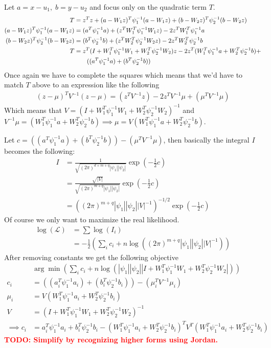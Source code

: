 \documentclass[11pt]{article}
\renewcommand{\det}[1]{|#1|}
\newcommand{\mf}{-\frac{1}{2}}
\newcommand{\todo}[1]{\textbf{\textcolor{red}{TODO: #1}}}
\begin{document}
Let $a = x-u_1, \; b = y-u_2$ and focus only on the quadratic term $T$.
\begin{align}
  T &= z^Tz + (a-W_1z)^T\psi_1^{-1}(a-W_1z) +
  (b-W_2z)^T\psi_2^{-1}(b-W_2z)\\
  (a-W_1z)^T\psi_1^{-1}(a-W_1z) &= (a^T\psi_1^{-1}a)+  (z^TW_1^T\psi_1^{-1}W_1z) - 2z^TW_1^T\psi_1^{-1}a\\
  (b-W_2z)^T\psi_2^{-1}(b-W_2z) &= (b^T\psi_2^{-1}b)+  (z^TW_2^T\psi_2^{-1}W_2z) - 2z^TW_2^T\psi_2^{-1}b\\
  T &= z^T(I+W_1^T\psi_1^{-1}W_1+W_2^T\psi_2^{-1}W_2)z -2z^T(W_1^T\psi_1^{-1}a + W_2^T\psi_2^{-1}b) + \notag\\
  & \qquad ((a^T\psi_1^{-1}a) + (b^T\psi_2^{-1}b))
\end{align}
Once again we have to complete the squares which means that we'd have to match $T$ above to an expression like the following
\begin{align}
  (z-\mu)^T V^{-1}(z-\mu)=  (z^T V^{-1}z) -2z^TV^{-1}\mu + (\mu^T V^{-1}\mu)
\end{align}
Which means that $V = (I+W_1^T\psi_1^{-1}W_1+W_2^T\psi_2^{-1}W_2)^{-1}$ and $V^{-1}\mu = (W_1^T\psi_1^{-1}a + W_2^T\psi_2^{-1}b) \implies \mu = V(W_1^T\psi_1^{-1}a + W_2^T\psi_2^{-1}b)$.

Let $c = ((a^T\psi_1^{-1}a) + (b^T\psi_2^{-1}b)) - (\mu^T V^{-1}\mu)$, then basically the integral $I$ becomes the following:
\begin{align}
  I &= \frac{1}{\sqrt{(2\pi)^{d+m+q} \det{\psi_1}\det{\psi_2} }} \exp(\mf c)\\
  &= \frac{\sqrt{\det{V}}}{\sqrt{(2\pi)^{m+q} \det{\psi_1}\det{\psi_2} }} \exp(\mf c)\\
  &= ((2\pi)^{m+q} \det{\psi_1}\det{\psi_2}\det{V}^{-1})^{-1/2}\exp(\mf c)
\end{align}
Of course we only want to maximize the real likelihood.
\begin{align}
  \log(\mathcal{L})&= \sum \log(I_i) \\
  &= \mf (\sum_i c_i + n \log((2\pi)^{m+q} \det{\psi_1}\det{\psi_2}\det{V}^{-1}))
\end{align}
After removing constants we get the following objective
\begin{align}
  & \arg\min (\sum_i c_i + n \log(\det{\psi_1}\det{\psi_2}\det{I+W_1^T\psi_1^{-1}W_1+W_2^T\psi_2^{-1}W_2}))\\
  c_i &= ((a_i^T\psi_1^{-1}a_i) + (b_i^T\psi_2^{-1}b_i)) - (\mu_i^T V^{-1}\mu_i)\\
  \mu_i &= V(W_1^T\psi_1^{-1}a_i + W_2^T\psi_2^{-1}b_i)\\
  V &= (I+W_1^T\psi_1^{-1}W_1+W_2^T\psi_2^{-1}W_2)^{-1}\\
  \implies c_i &= a_i^T\psi_1^{-1}a_i + b_i^T\psi_2^{-1}b_i - (W_1^T\psi_1^{-1}a_i + W_2^T\psi_2^{-1}b_i)^T V^T(W_1^T\psi_1^{-1}a_i + W_2^T\psi_2^{-1}b_i)
\end{align}
\todo{Simplify by recognizing higher forms using Jordan.}
\end{document}
